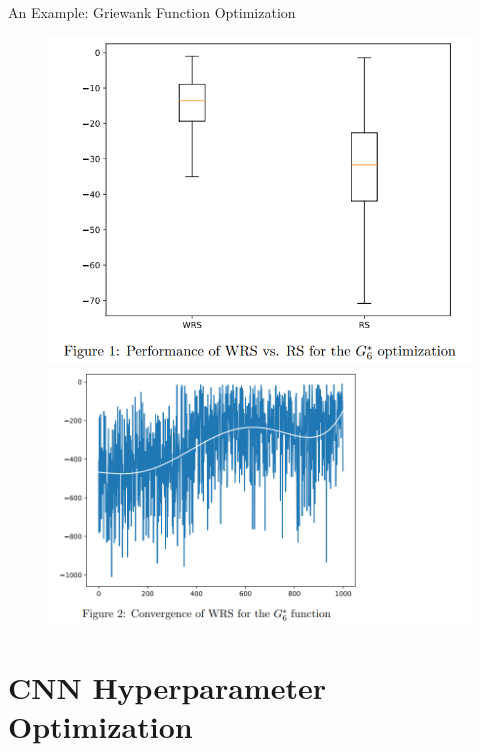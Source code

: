 \documentclass{beamer}
\begin{document}
\begin{frame}{An Example: Griewank Function Optimization}
\centering 


\begin{figure}
        \centering
        \includegraphics[scale=0.43]{images/wrs5.png}
        \centering
        \includegraphics[scale=0.43]{images/wrs6.png}
        \label{fig:enter-label}
    \end{figure}
 
\end{frame}


\section{CNN Hyperparameter Optimization}
\end{document}
